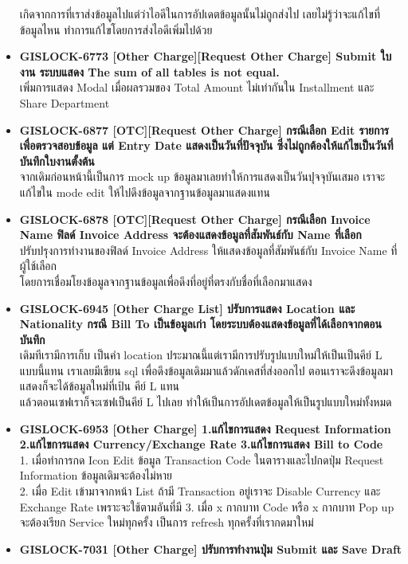 \begin{itemize}
        เกิดจากการที่เราส่งข้อมูลไปแต่ว่าไอดีในการอัปเดตข้อมูลนั้นไม่ถูกส่งไป เลยไม่รู้ว่าจะแก้ไขที่ข้อมูลไหน ทำการแก้ไขโดยการส่งไอดีเพิ่มไปด้วย
    \item \textbf{{GISLOCK-6773 [Other Charge][Request Other Charge] Submit ใบงาน ระบบแสดง The sum of all tables is not equal.}} \\
        เพิ่มการแสดง Modal เมื่อผลรวมของ Total Amount ไม่เท่ากันใน Installment และ Share Department
    \item \textbf{{GISLOCK-6877 [OTC][Request Other Charge] กรณีเลือก Edit รายการเพื่อตรวจสอบข้อมูล แต่ Entry Date แสดงเป็นวันที่ปัจจุบัน ซึ่งไม่ถูกต้องให้แก้ไขเป็นวันที่บันทึกใบงานตั้งต้น}} \\
        จากเดิมก่อนหน้านี้เป็นการ mock up ข้อมูลมาเลยทำให้การแสดงเป็นวันปุจจุบันเสมอ เราจะแก้ไขใน mode edit ให้ไปดึงข้อมูลจากฐานข้อมูลมาแสดงแทน
    \item \textbf{{GISLOCK-6878 [OTC][Request Other Charge] กรณีเลือก Invoice Name ฟิลด์ Invoice Address จะต้องแสดงข้อมูลที่สัมพันธ์กับ Name ที่เลือก}} \\
        ปรับปรุงการทำงานของฟิลด์ Invoice Address ให้แสดงข้อมูลที่สัมพันธ์กับ Invoice Name ที่ผู้ใช้เลือก \\
        โดยการเชื่อมโยงข้อมูลจากฐานข้อมูลเพื่อดึงที่อยู่ที่ตรงกับชื่อที่เลือกมาแสดง
    \item \textbf{{GISLOCK-6945 [Other Charge List] ปรับการแสดง Location และ Nationality กรณี Bill To เป็นข้อมูลเก่า โดยระบบต้องแสดงข้อมูลที่ได้เลือกจากตอนบันทึก}} \\
        เดิมทีเรามีการเก็บ เป็นคำ location ประมาณนี้แต่เรามีการปรับรูปแบบใหม่ให้เป็นเป็นคีย์ L แบบนี้แทน เราเลยมีเขียน sql เพื่อดึงข้อมูลเดิมมาแล้วดักเคสที่ส่งออกไป ตอนเราจะดึงข้อมูลมาแสดงก็จะได้ข้อมูลใหม่ที่เป้น คีย์ L แทน\\
        แล้วตอนเซฟเราก็จะเซฟเป็นคีย์ L ไปเลย ทำให้เป็นการอัปเดตข้อมูลให้เป็นรูปแบบใหม่ทั้งหมด
    \item \textbf{{GISLOCK-6953 [Other Charge] 1.แก้ไขการแสดง Request Information 2.แก้ไขการแสดง Currency/Exchange Rate 3.แก้ไขการแสดง Bill to Code}} \\
        1. เมื่อทำการกด Icon Edit ข้อมูล Transaction Code ในตารางและไปกดปุ่ม Request Information ข้อมูลเดิมจะต้องไม่หาย \\
        2. เมื่อ Edit เข้ามาจากหน้า List ถ้ามี Transaction อยู่เราจะ Disable Currency และ Exchange Rate เพราะจะใช้ตามอันที่มี
        3. เมื่อ x กากบาท Code หรือ x กากบาท Pop up จะต้องเรียก Service ใหม่ทุกครั้ง เป็นการ refresh ทุกครั้งที่เรากดมาใหม่
    \item \textbf{{GISLOCK-7031 [Other Charge] ปรับการทำงานปุ่ม Submit และ Save Draft}} \\

\end{itemize}
